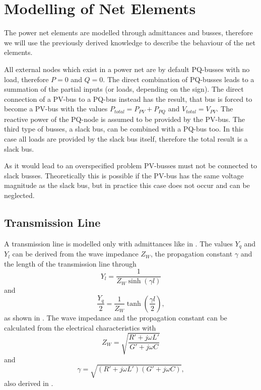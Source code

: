 \section{Modelling of Net Elements}

The power net elements are modelled through admittances and busses, therefore we will use the previously derived knowledge to describe the behaviour of the net elements.

All external nodes which exist in a power net are by default PQ-busses with no load, therefore $P = 0$ and $Q = 0$. The direct combination of PQ-busses leads to a summation of the partial inputs (or loads, depending on the sign). The direct connection of a PV-bus to a PQ-bus instead has the result, that bus is forced to become a PV-bus with the values $P_{total} = P_{PV} + P_{PQ}$ and $V_{total} = V_{PV}$. The reactive power of the PQ-node is assumed to be provided by the PV-bus. The third type of busses, a slack bus, can be combined with a PQ-bus too. In this case all loads are provided by the slack bus itself, therefore the total result is a slack bus.

As it would lead to an overspecified problem PV-busses must not be connected to slack busses. Theoretically this is possible if the PV-bus has the same voltage magnitude as the slack bus, but in practice this case does not occur and can be neglected.

\subsection{Transmission Line}
A transmission line is modelled only with admittances like in . The values $Y_q$ and $Y_l$ can be derived from the wave impedance $Z_W$, the propagation constant $\gamma$ and the length of the transmission line through
\begin{equation}
	Y_l = \frac{1}{Z_W \sinh \left( \gamma l \right)}
\end{equation}
and
\begin{equation}
	\frac{Y_q}{2} = \frac{1}{Z_W} \tanh \left( \frac{\gamma l}{2} \right),
\end{equation}
as shown in \citep[p. 155]{powerSystemAnalysis}. The wave impedance and the propagation constant can be calculated from the electrical characteristics with
\begin{equation}
	Z_W = \sqrt{\frac{R' + j \omega L'}{G' + j \omega C}}
\end{equation}
and 
\begin{equation}
	\gamma = \sqrt{\left( R' + j \omega L' \right) \left( G' + j \omega C \right)},
\end{equation}
also derived in \citep[p. 153]{powerSystemAnalysis}.


